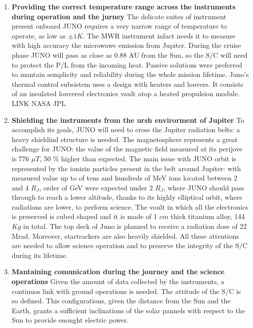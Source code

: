 \begin{enumerate}[leftmargin=1.5em]
    \item \textbf{Providing the correct temperature range across the instruments during operation and the jurney}
    \newline The delicate suites of instrument present onboard JUNO requires a very narrow range of temperature to operate, as 
    low as $\pm 1 K$. The MWR instrument infact needs it to measure with high accuracy the microwawe emission from Jupiter. During the cruise phase JUNO will pass as close as 0.88 AU from the Sun, so the S/C will need to protect the P/L from the incoming heat. Passive solutions were preferred to mantain semplicity and reliability during the whole mission lifetime. Juno's thermal control subsistem uses a design with heaters and louvers. It consists of an insulated louvered electronics vault atop a heated propulsion module. 
    LINK NASA JPL 
    \item \textbf{Shielding the instruments from the ursh envirorment of Jupiter}
    \newline To accomplish its goals, JUNO will need to cross the Jupiter radiation belts: a heavy shieldind structure is needed. The magnetosphere represents a great challenge for JUNO: the value of the magnetic field measured at its perijove is 776 $\mu T$, 50 \% higher than expected. The main issue with JUNO orbit is represented by the ionizin particles present in the belt around Jupiter: with measured value up to of tens and hundreds of MeV ions located between 2 and 4 $R_{J}$, order of GeV were expected under 2 $R_{J}$, where JUNO should pass through to reach a lower altitude, thanks to its highly elliptical orbit, where radiations are lower, to perform science. The voult in which all the electronics is preserved is cubed shaped and it is made of 1 $cm$ thick titanium alloy, 144 $Kg$ in total. The top deck of Juno is planned to receive a radiation dose of 22 Mrad. Moreover, startrackers are also heavily shielded. All these attentions are needed to allow science operation and to preserve the integrity of the S/C during its lifetime. 
    \item \textbf{Mantaining comunication during the journey and the science operations}
    \newline Given the amount of data collected by the instruments, a continuos link with ground operations is needed. The attitude of the S/C is so defined. This configurations, given the distance from the Sun and the Earth, grants a sufficient inclinations of the solar pannels with respect to the Sun to provide enought electric power. 
\end{enumerate}  